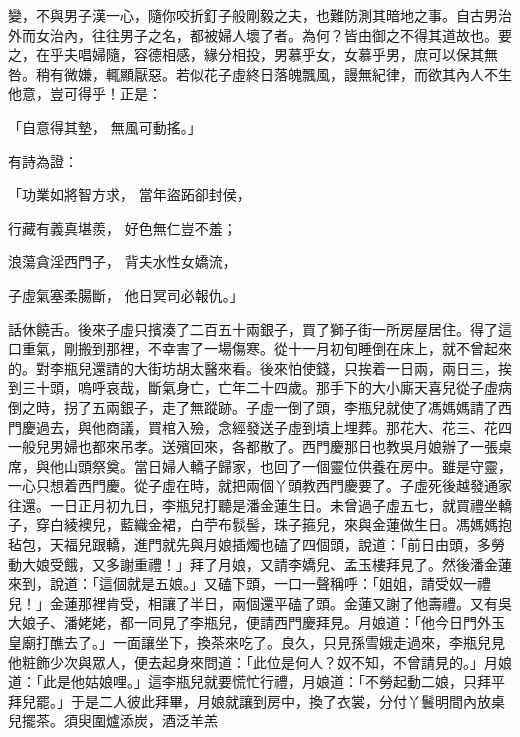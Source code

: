 變，不與男子漢一心，隨你咬折釘子般剛毅之夫，也難防測其暗地之事。自古男治外而女治內，往往男子之名，都被婦人壞了者。為何？皆由御之不得其道故也。要之，在乎夫唱婦隨，容德相感，緣分相投，男慕乎女，女慕乎男，庶可以保其無咎。稍有微嫌，輒顯厭惡。若似花子虛終日落魄飄風，謾無紀律，而欲其內人不生他意，豈可得乎！正是：

「自意得其墊，  無風可動搖。」

有詩為證：

「功業如將智方求，  當年盜跖卻封侯，

行藏有義真堪羨，  好色無仁豈不羞；

浪蕩貪淫西門子，  背夫水性女嬌流，

子虛氣塞柔腸斷，  他日冥司必報仇。」

話休饒舌。後來子虛只擯湊了二百五十兩銀子，買了獅子街一所房屋居住。得了這口重氣，剛搬到那裡，不幸害了一場傷寒。從十一月初旬睡倒在床上，就不曾起來的。對李瓶兒還請的大街坊胡太醫來看。後來怕使錢，只挨着一日兩，兩日三，挨到三十頭，嗚呼哀哉，斷氣身亡，亡年二十四歲。那手下的大小廝天喜兒從子虛病倒之時，拐了五兩銀子，走了無蹤跡。子虛一倒了頭，李瓶兒就使了馮媽媽請了西門慶過去，與他商議，買棺入殮，念經發送子虛到墳上埋葬。那花大、花三、花四一般兒男婦也都來吊孝。送殯回來，各都散了。西門慶那日也教吳月娘辦了一張桌席，與他山頭祭奠。當日婦人轎子歸家，也回了一個靈位供養在房中。雖是守靈，一心只想着西門慶。從子虛在時，就把兩個丫頭教西門慶要了。子虛死後越發通家往還。一日正月初九日，李瓶兒打聽是潘金蓮生日。未曾過子虛五七，就買禮坐轎子，穿白綾襖兒，藍織金裙，白苧布䯼髻，珠子箍兒，來與金蓮做生日。馮媽媽抱毡包，天福兒跟轎，進門就先與月娘插燭也磕了四個頭，說道：「前日由頭，多勞動大娘受餓，又多謝重禮！」拜了月娘，又請李嬌兒、孟玉樓拜見了。然後潘金蓮來到，說道：「這個就是五娘。」又磕下頭，一口一聲稱呼：「姐姐，請受奴一禮兒！」金蓮那裡肯受，相讓了半日，兩個還平磕了頭。金蓮又謝了他壽禮。又有吳大娘子、潘姥姥，都一同見了李瓶兒，便請西門慶拜見。月娘道：「他今日門外玉皇廟打醮去了。」一面讓坐下，換茶來吃了。良久，只見孫雪娥走過來，李瓶兒見他粧飾少次與眾人，便去起身來問道：「此位是何人？奴不知，不曾請見的。」月娘道：「此是他姑娘哩。」這李瓶兒就要慌忙行禮，月娘道：「不勞起動二娘，只拜平拜兒罷。」于是二人彼此拜畢，月娘就讓到房中，換了衣裳，分付丫鬟明間內放桌兒擺茶。須臾圍爐添炭，酒泛羊羔 
